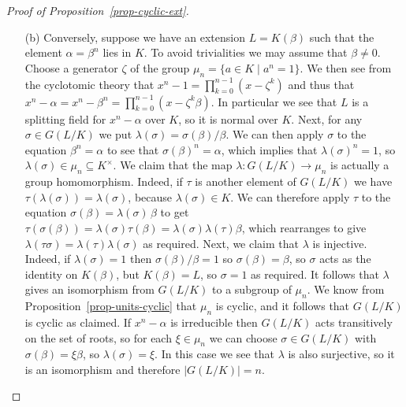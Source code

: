 \documentclass{amsart}
\newcommand{\al}        {\alpha}
\newcommand{\bt}        {\beta}
\newcommand{\zt}        {\zeta}
\newcommand{\lm}        {\lambda}
\newcommand{\ep}        {\epsilon}
\newcommand{\sg}        {\sigma}
\newcommand{\st}        {\;|\;}
\newcommand{\tm}        {\times}
\newcommand{\sse}       {\subseteq}
\renewcommand{\:}{\colon}
\theoremstyle{definition}
\begin{document}
\begin{proof}[Proof of Proposition~\ref{prop-cyclic-ext}]
\begin{itemize}
   Next, we claim that the elements $1,\bt,\dotsc,\bt^{n-1}$ are
   linearly independent over $K$.  To see this, consider a linear
   relation $\sum_{i=0}^{n-1}a_i\bt^i=0$, with $a_i\in K$.  We can apply
   $\ep_r$ to both sides of this equation.  On the right hand side we
   get zero, and on the left hand side most terms become zero, but we
   have $\ep_r(a_r\bt^r)=a_r\bt^r$.  As $\bt\neq 0$ this gives $a_r=0$,
   but $r$ was arbitrary so our linear relation is the trivial one.  We
   conclude that the list $1,\bt,\dotsc,\bt^{n-1}$ is indeed linearly
   independent, or equivalently that $\bt$ is not a root of any
   polynomial in $K[x]$ of degree less than $n$.  Thus, the polynomial
   $f(x)=x^n-\al$ must actually be the minimal polynomial of $\bt$ over
   $K$.
  \item[(b)] Conversely, suppose we have an extension $L=K(\bt)$ such
   that the element $\al=\bt^n$ lies in $K$.  To avoid trivialities we
   may assume that $\bt\neq 0$.  Choose a generator $\zt$ of the group
   $\mu_n=\{a\in K\st a^n=1\}$.  We then see from the cyclotomic
   theory that $x^n-1=\prod_{k=0}^{n-1}(x-\zt^k)$ and thus that
   $x^n-\al=x^n-\bt^n=\prod_{k=0}^{n-1}(x-\zt^k\bt)$.  In particular
   we see that $L$ is a splitting field for $x^n-\al$ over $K$, so it
   is normal over $K$.  Next, for any $\sg\in G(L/K)$ we put
   $\lm(\sg)=\sg(\bt)/\bt$.  We can then apply $\sg$ to the equation
   $\bt^n=\al$ to see that $\sg(\bt)^n=\al$, which implies that
   $\lm(\sg)^n=1$, so $\lm(\sg)\in\mu_n\sse K^\tm$.  We claim that the
   map $\lm\:G(L/K)\to\mu_n$ is actually a group homomorphism.
   Indeed, if $\tau$ is another element of $G(L/K)$ we have
   $\tau(\lm(\sg))=\lm(\sg)$, because $\lm(\sg)\in K$.  We can
   therefore apply $\tau$ to the equation $\sg(\bt)=\lm(\sg)\,\bt$ to
   get $\tau(\sg(\bt))=\lm(\sg)\tau(\bt)=\lm(\sg)\lm(\tau)\bt$, which
   rearranges to give $\lm(\tau\sg)=\lm(\tau)\lm(\sg)$ as required.
   Next, we claim that $\lm$ is injective.  Indeed, if $\lm(\sg)=1$
   then $\sg(\bt)/\bt=1$ so $\sg(\bt)=\bt$, so $\sg$ acts as the
   identity on $K(\bt)$, but $K(\bt)=L$, so $\sg=1$ as required.  It
   follows that $\lm$ gives an isomorphism from $G(L/K)$ to a subgroup
   of $\mu_n$.  We know from Proposition~\ref{prop-units-cyclic} that
   $\mu_n$ is cyclic, and it follows that $G(L/K)$ is cyclic as
   claimed.  If $x^n-\al$ is irreducible then $G(L/K)$ acts
   transitively on the set of roots, so for each $\xi\in\mu_n$ we can
   choose $\sg\in G(L/K)$ with $\sg(\bt)=\xi\bt$, so $\lm(\sg)=\xi$.
   In this case we see that $\lm$ is also surjective, so it is an
   isomorphism and therefore $|G(L/K)|=n$.
 \end{itemize}
\end{proof}
\end{document}
